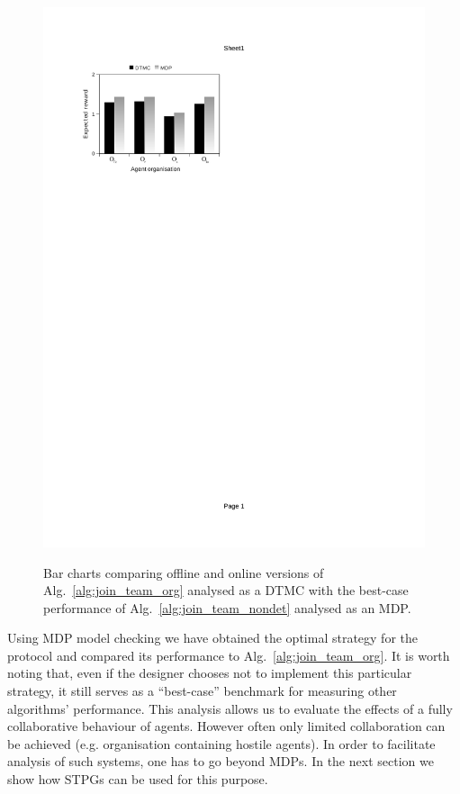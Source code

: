 \documentclass{llncs}
\begin{document}
\begin{figure}[H]
{\includegraphics[clip=true, trim=63 581.5 320 80, scale=0.63]{images/w2_mdp_online}
}
\vspace{-10pt}
\caption{Bar charts comparing offline and online versions of Alg.~\ref{alg:join_team_org} analysed as a DTMC with the best-case performance of Alg.~\ref{alg:join_team_nondet} analysed as an MDP. }
\label{fig:bar_chart_mdp}
\end{figure}

\vspace{-22pt}


Using MDP model checking we have obtained the optimal strategy for the protocol and compared its performance to Alg.~\ref{alg:join_team_org}. It is worth noting that, even if the designer chooses not to implement this particular strategy, it still serves as a ``best-case'' benchmark for measuring other algorithms' performance. This analysis allows us to evaluate the effects of a fully collaborative behaviour of agents. However often only limited collaboration can be achieved (e.g. organisation containing hostile agents). In order to facilitate analysis of such systems, one has to go beyond MDPs. In the next section we show how STPGs can be used for this purpose.
\end{document}
